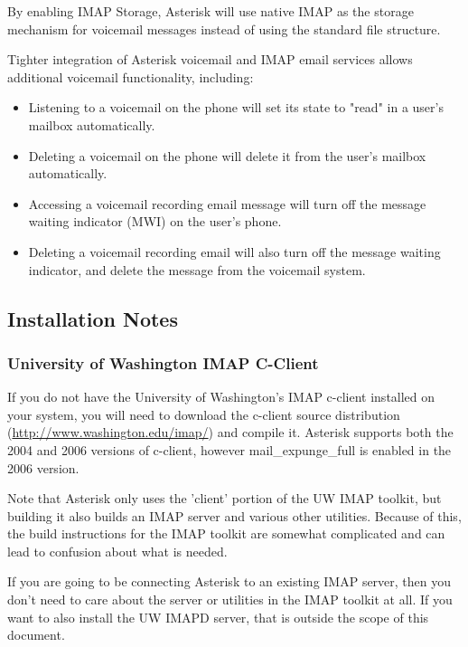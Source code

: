 By enabling IMAP Storage,  Asterisk will use native IMAP as the storage
mechanism for voicemail messages instead of using the standard file structure.

Tighter integration of Asterisk voicemail and IMAP email services allows
additional voicemail functionality, including:

\begin{itemize}
 \item Listening to a voicemail on the phone will set its state to "read" in
   a user's mailbox automatically.
 \item Deleting a voicemail on the phone will delete it from the user's
   mailbox automatically.
 \item Accessing a voicemail recording email message will turn off the message
   waiting indicator (MWI) on the user's phone.
 \item Deleting a voicemail recording email will also turn off the message 
   waiting indicator, and delete the message from the voicemail system.
\end{itemize}

\subsection{Installation Notes}

\subsubsection{University of Washington IMAP C-Client}

If you do not have the University of Washington's IMAP c-client
installed on your system, you will need to download the c-client
source distribution (\url{http://www.washington.edu/imap/}) and compile it.
Asterisk supports both the 2004 and 2006 versions of c-client, however
mail\_expunge\_full is enabled in the 2006 version.

Note that Asterisk only uses the 'client' portion of the UW IMAP toolkit,
but building it also builds an IMAP server and various other utilities.
Because of this, the build instructions for the IMAP toolkit are somewhat
complicated and can lead to confusion about what is needed.

If you are going to be connecting Asterisk to an existing IMAP server,
then you don't need to care about the server or utilities in the IMAP
toolkit at all. If you want to also install the UW IMAPD server, that
is outside the scope of this document.

